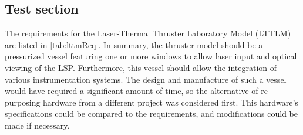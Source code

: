         \subsection{Test section} \label{sec:design_testSection}
            The requirements for the Laser-Thermal Thruster Laboratory Model (LTTLM) are listed in \autoref{tab:lttmReq}. In summary, the thruster model should be a pressurized vessel featuring one or more windows to allow laser input and optical viewing of the LSP. Furthermore, this vessel should allow the integration of various instrumentation systems. The design and manufacture of such a vessel would have required a significant amount of time, so the alternative of re-purposing hardware from a different project was considered first. This hardware's specifications could be compared to the requirements, and modifications could be made if necessary.

